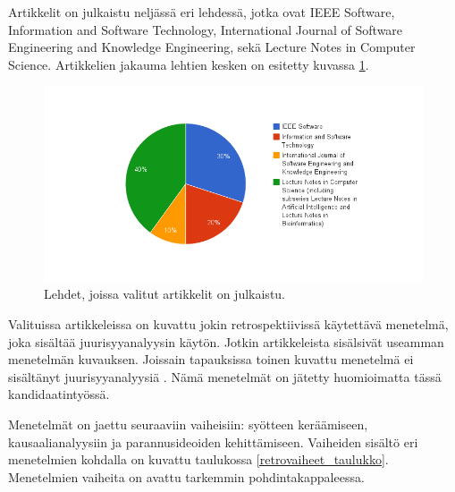 Artikkelit on julkaistu neljässä eri lehdessä, jotka ovat IEEE Software, Information and Software Technology, International Journal of Software Engineering and Knowledge Engineering, sekä Lecture Notes in Computer Science. Artikkelien jakauma lehtien kesken on esitetty kuvassa \ref{artikkeli_lehdet_pie}.
\begin{figure}[ht!]
\centering
\includegraphics[width=200mm]{artikkelien_lehdet.png}
\caption{Lehdet, joissa valitut artikkelit on julkaistu.}
\label{artikkeli_lehdet_pie}
\end{figure}

Valituissa artikkeleissa on kuvattu jokin retrospektiivissä käytettävä menetelmä, joka sisältää juurisyyanalyysin käytön. Jotkin artikkeleista sisälsivät useamman menetelmän kuvauksen. Joissain tapauksissa toinen kuvattu menetelmä ei sisältänyt juurisyyanalyysiä \citep{staalhane2004root, dingsoyr2003extending}. Nämä menetelmät on jätetty huomioimatta tässä kandidaatintyössä.

Menetelmät on jaettu seuraaviin vaiheisiin: syötteen keräämiseen, kausaalianalyysiin ja parannusideoiden kehittämiseen. Vaiheiden sisältö eri menetelmien kohdalla on kuvattu taulukossa \ref{retrovaiheet_taulukko}. Menetelmien vaiheita on avattu tarkemmin pohdintakappaleessa.

